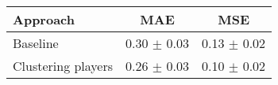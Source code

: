    \begin{tabular}{l c c}
    \toprule
    
    Approach  & MAE & MSE \\ %
    
    \midrule
    Baseline            & 0.30 $\pm$ 0.03  & 0.13 $\pm$ 0.02  \\ %
    Clustering players  & 0.26 $\pm$ 0.03  & 0.10 $\pm$ 0.02  \\ %
    

    \bottomrule
        
    \end{tabular}
    
    
    
    
    

        

